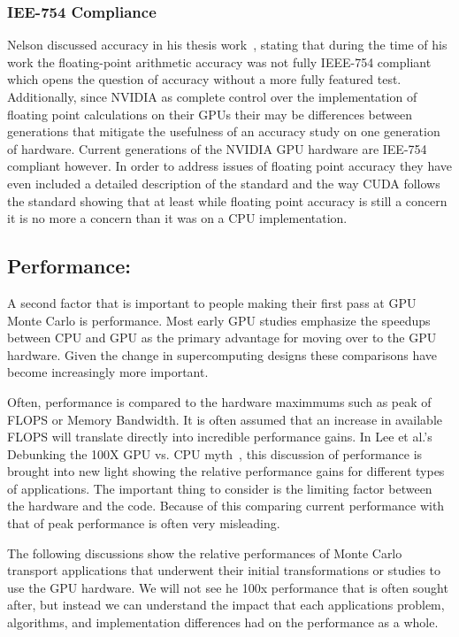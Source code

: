 \subsubsection*{ \textbf{IEE-754 Compliance} }
Nelson discussed accuracy in his thesis work~\cite{nelson2009monte}, stating that during the time of his work the floating-point arithmetic accuracy was not fully IEEE-754 compliant which opens the question of accuracy without a more fully featured test. 
%
Additionally, since NVIDIA as complete control over the implementation of floating point calculations on their GPUs their may be differences between generations that mitigate the usefulness of an accuracy study on one generation of hardware.
%
Current generations of the NVIDIA GPU hardware are IEE-754 compliant however. 
%
In order to address issues of floating point accuracy they have even included a detailed description of the standard and the way CUDA follows the standard showing that at least while floating point accuracy is still a concern it is no more a concern than it was on a CPU implementation.~\cite{cudaToolkitv7.5}
%

\subsection*{\textbf{Performance:}}

A second factor that is important to people making their first pass at GPU Monte Carlo is performance.
%
Most early GPU studies emphasize the speedups between CPU and GPU as the primary advantage for moving over to the GPU hardware.
%
Given the change in supercomputing designs these comparisons have become increasingly more important.
%

%
Often, performance is compared to the hardware maximmums such as peak of FLOPS or Memory Bandwidth.
%
It is often assumed that an increase in available FLOPS will translate directly into incredible performance gains.
%
In Lee et al.'s Debunking the 100X GPU vs. CPU myth~\cite{lee2010debunking}, this discussion of performance is brought into new light showing the relative performance gains for different types of applications.
%
The important thing to consider is the limiting factor between the hardware and the code.
%
Because of this comparing current performance with that of peak performance is often very misleading.
%

%
The following discussions show the relative performances of Monte Carlo transport applications that underwent their initial transformations or studies to use the GPU hardware.
%
We will not see he 100x performance that is often sought after, but instead we can understand the impact that each applications problem, algorithms, and implementation differences had on the performance as a whole.
%

